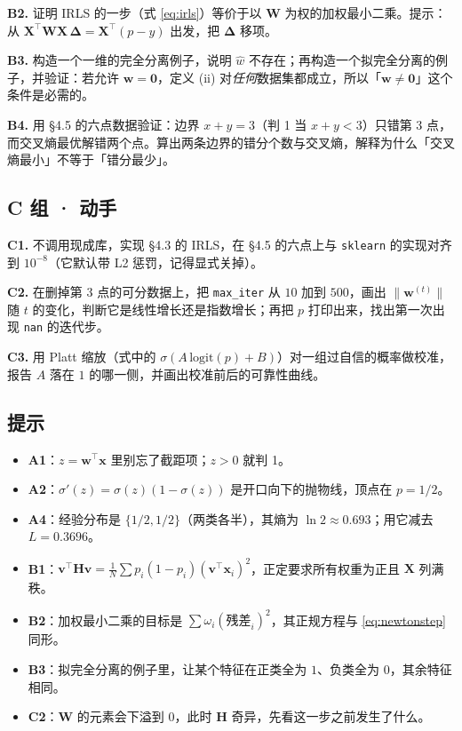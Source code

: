 \documentclass[11pt,a4paper,fontset=windows,zihao=-4]{ctexart}
\newcommand{\bX}{\mathbf{X}}
\newcommand{\bw}{\mathbf{w}}
\newcommand{\bx}{\mathbf{x}}
\newcommand{\bv}{\mathbf{v}}
\newcommand{\bH}{\mathbf{H}}
\newcommand{\bW}{\mathbf{W}}
\newcommand{\bDelta}{\boldsymbol{\Delta}}
\newcommand{\bzero}{\mathbf{0}}
\newcommand{\tp}{^{\top}}
\newcommand{\norm}[1]{\lVert #1\rVert}
\begin{document}
\noindent\textbf{B2.} 证明 IRLS 的一步（式 \eqref{eq:irls}）等价于以 $\bW$ 为权的加权最小二乘。提示：从 $\bX\tp\bW\bX\,\bDelta=\bX\tp(p-y)$ 出发，把 $\bDelta$ 移项。

\noindent\textbf{B3.} 构造一个一维的完全分离例子，说明 $\hat w$ 不存在；再构造一个拟完全分离的例子，并验证：若允许 $\bw=\bzero$，定义 (ii) 对\emph{任何}数据集都成立，所以「$\bw\ne\bzero$」这个条件是必需的。

\noindent\textbf{B4.} 用 \S4.5 的六点数据验证：边界 $x+y=3$（判 1 当 $x+y<3$）只错第 3 点，而交叉熵最优解错两个点。算出两条边界的错分个数与交叉熵，解释为什么「交叉熵最小」不等于「错分最少」。

\subsection*{C 组 · 动手}

\noindent\textbf{C1.} 不调用现成库，实现 \S4.3 的 IRLS，在 \S4.5 的六点上与 \texttt{sklearn} 的实现对齐到 $10^{-8}$（它默认带 L2 惩罚，记得显式关掉）。

\noindent\textbf{C2.} 在删掉第 3 点的可分数据上，把 \texttt{max\_iter} 从 $10$ 加到 $500$，画出 $\norm{\bw^{(t)}}$ 随 $t$ 的变化，判断它是线性增长还是指数增长；再把 $p$ 打印出来，找出第一次出现 \texttt{nan} 的迭代步。

\noindent\textbf{C3.} 用 Platt 缩放（式中的 $\sigma(A\,\mathrm{logit}(p)+B)$）对一组过自信的概率做校准，报告 $A$ 落在 $1$ 的哪一侧，并画出校准前后的可靠性曲线。

\subsection*{提示}

\begin{itemize}[itemsep=0.2em]
  \item \textbf{A1}：$z=\bw\tp\bx$ 里别忘了截距项；$z>0$ 就判 1。
  \item \textbf{A2}：$\sigma'(z)=\sigma(z)(1-\sigma(z))$ 是开口向下的抛物线，顶点在 $p=1/2$。
  \item \textbf{A4}：经验分布是 $\{1/2,1/2\}$（两类各半），其熵为 $\ln2\approx0.693$；用它减去 $L=0.3696$。
  \item \textbf{B1}：$\bv\tp\bH\bv=\frac1N\sum p_i(1-p_i)(\bv\tp\bx_i)^2$，正定要求所有权重为正且 $\bX$ 列满秩。
  \item \textbf{B2}：加权最小二乘的目标是 $\sum \omega_i(\text{残差}_i)^2$，其正规方程与 \eqref{eq:newtonstep} 同形。
  \item \textbf{B3}：拟完全分离的例子里，让某个特征在正类全为 $1$、负类全为 $0$，其余特征相同。
  \item \textbf{C2}：$\bW$ 的元素会下溢到 $0$，此时 $\bH$ 奇异，先看这一步之前发生了什么。
\end{itemize}
\end{document}
